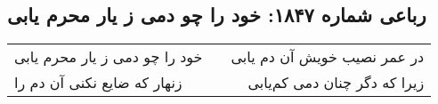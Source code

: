 \begin{center}
\section*{رباعی شماره ۱۸۴۷: خود را چو دمی ز یار محرم یابی}
\label{sec:1847}
\begin{longtable}{l p{0.5cm} r}
خود را چو دمی ز یار محرم یابی
&&
در عمر نصیب خویش آن دم یابی
\\
زنهار که ضایع نکنی آن دم را
&&
زیرا که دگر چنان دمی کم‌یابی
\\
\end{longtable}
\end{center}
